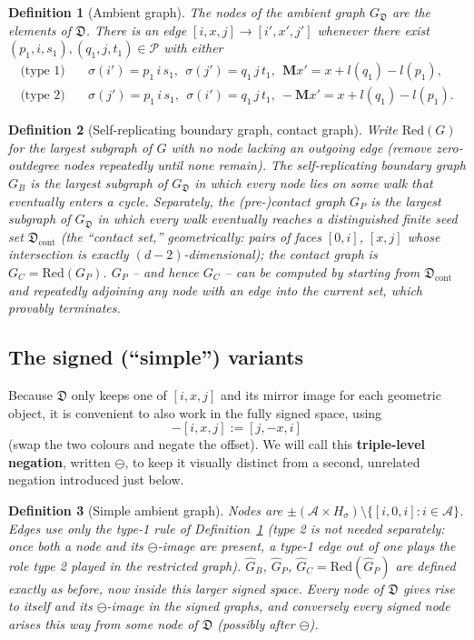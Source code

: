 \documentclass[11pt]{article}
\newtheorem{definition}{Definition}
\begin{document}
\begin{definition}[Ambient graph]\label{def:ambient}
The nodes of the ambient graph $G_\mathfrak{D}$ are the elements of
$\mathfrak{D}$. There is an edge $[i,x,j]\to[i',x',j']$ whenever there exist
$(p_1,i,s_1),(q_1,j,t_1)\in\mathcal{P}$ with either
\begin{align*}
\text{(type 1)}\quad &\sigma(i')=p_1\,i\,s_1,\ \ \sigma(j')=q_1\,j\,t_1,\ \ \mathbf{M}x' = x+l(q_1)-l(p_1),\\
\text{(type 2)}\quad &\sigma(j')=p_1\,i\,s_1,\ \ \sigma(i')=q_1\,j\,t_1,\ -\mathbf{M}x' = x+l(q_1)-l(p_1).
\end{align*}
\end{definition}

\begin{definition}[Self-replicating boundary graph, contact graph]
Write $\mathrm{Red}(G)$ for the largest subgraph of $G$ with no node lacking
an outgoing edge (remove zero-outdegree nodes repeatedly until none remain).
The self-replicating boundary graph $G_B$ is the largest subgraph of
$G_\mathfrak{D}$ in which every node lies on some walk that eventually enters
a cycle. Separately, the (pre-)contact graph $G_P$ is the largest subgraph of
$G_\mathfrak{D}$ in which \emph{every} walk eventually reaches a
distinguished finite seed set $\mathfrak{D}_{\mathrm{cont}}$ (the ``contact
set,'' geometrically: pairs of faces $[0,i]$, $[x,j]$ whose intersection is
exactly $(d-2)$-dimensional); the contact graph is $G_C=\mathrm{Red}(G_P)$.
$G_P$ -- and hence $G_C$ -- can be computed by starting from
$\mathfrak{D}_{\mathrm{cont}}$ and repeatedly adjoining any node with an edge
into the current set, which provably terminates.
\end{definition}

\subsection{The signed (``simple'') variants}

Because $\mathfrak{D}$ only keeps one of $[i,x,j]$ and its mirror image for
each geometric object, it is convenient to also work in the fully signed
space, using
$$-[i,x,j] := [j,-x,i]$$
(swap the two colours and negate the offset). We will call this
\textbf{triple-level negation}, written $\ominus$, to keep it visually distinct
from a second, unrelated negation introduced just below.

\begin{definition}[Simple ambient graph]
Nodes are $\pm(\mathcal{A}\times H_\sigma)\setminus\{[i,0,i]:i\in\mathcal{A}\}$.
Edges use \emph{only} the type-1 rule of Definition~\ref{def:ambient} (type 2
is not needed separately: once both a node and its $\ominus$-image are
present, a type-1 edge out of one plays the role type 2 played in the
restricted graph). $\hat G_B$, $\hat G_P$, $\hat G_C=\mathrm{Red}(\hat G_P)$
are defined exactly as before, now inside this larger signed space. Every node
of $\mathfrak{D}$ gives rise to itself and its $\ominus$-image in the signed
graphs, and conversely every signed node arises this way from some node of
$\mathfrak{D}$ (possibly after $\ominus$).
\end{definition}
\end{document}
